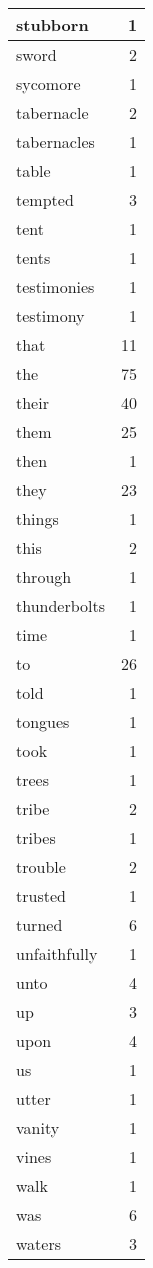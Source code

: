 \begin{center}
\begin{longtable}{l|r}
stubborn & 1\\ \hline 
sword & 2\\ \hline 
sycomore & 1\\ \hline 
tabernacle & 2\\ \hline 
tabernacles & 1\\ \hline 
table & 1\\ \hline 
tempted & 3\\ \hline 
tent & 1\\ \hline 
tents & 1\\ \hline 
testimonies & 1\\ \hline 
testimony & 1\\ \hline 
that & 11\\ \hline 
the & 75\\ \hline 
their & 40\\ \hline 
them & 25\\ \hline 
then & 1\\ \hline 
they & 23\\ \hline 
things & 1\\ \hline 
this & 2\\ \hline 
through & 1\\ \hline 
thunderbolts & 1\\ \hline 
time & 1\\ \hline 
to & 26\\ \hline 
told & 1\\ \hline 
tongues & 1\\ \hline 
took & 1\\ \hline 
trees & 1\\ \hline 
tribe & 2\\ \hline 
tribes & 1\\ \hline 
trouble & 2\\ \hline 
trusted & 1\\ \hline 
turned & 6\\ \hline 
unfaithfully & 1\\ \hline 
unto & 4\\ \hline 
up & 3\\ \hline 
upon & 4\\ \hline 
us & 1\\ \hline 
utter & 1\\ \hline 
vanity & 1\\ \hline 
vines & 1\\ \hline 
walk & 1\\ \hline 
was & 6\\ \hline 
waters & 3\\ \hline 

\end{longtable}
\end{center}
